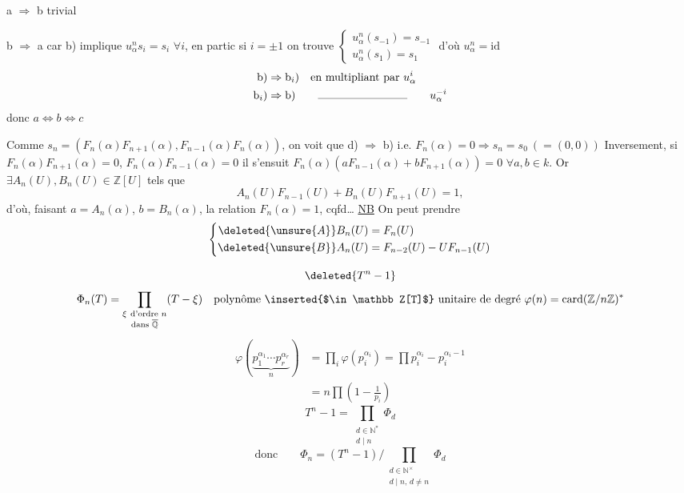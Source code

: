 a $\Rightarrow$ b trivial

b $\Rightarrow$ a car b) implique  $u_\alpha^ns_i=s_i$ $\forall i$, en
partic si $i=\pm1$ on trouve $\begin{cases}u_\alpha^n(s_{-1})=s_{-1}\\u_\alpha^n(s_1)=s_1\end{cases}$
d'où $u_\alpha^n=\mathrm{id}$
\[
\begin{aligned}
\text{b)}&\Rightarrow\text{b}_i\text{)}\quad\text{en multipliant par }u_\alpha^i\\
\text{b}_i\text{)}&\Rightarrow\text{b)}\qquad\rule{2.8cm}{.3pt}\qquad u_\alpha^{-i}
\end{aligned}
\]
donc $a\Longleftrightarrow b\Longleftrightarrow c$

Comme $s_n=(F_n(\alpha)F_{n+1}(\alpha),F_{n-1}(\alpha)F_n(\alpha))$, on voit
que d) $\Rightarrow$ b) i.e. $F_n(\alpha)=0\Rightarrow s_n=s_0\ (=(0,0))$
Inversement, si $F_n(\alpha)F_{n+1}(\alpha)=0$, $F_n(\alpha)F_{n-1}(\alpha)=0$ 
il s'ensuit $F_n(\alpha)(a F_{n-1}(\alpha)+b F_{n+1}(\alpha))=0$ $\forall a,b\in k$.
Or $\exists A_n(U),B_n(U)\in\mathbb Z[U]$ tels que
\[
A_n(U)F_{n-1}(U)+B_n(U)F_{n+1}(U)=1,
\]
d'où, faisant $a=A_n(\alpha)$, $b=B_n(\alpha)$, la relation $F_n(\alpha)=1$,
cqfd\ldots
\uline{NB} On peut prendre
\[
\left\{\begin{aligned}
\deleted{\unsure{A}}B_n(U)&=F_n(U)\\
\deleted{\unsure{B}}A_n(U)&=F_{n-2}(U)-UF_{n-1}(U)
\end{aligned}\right.
\]

\[
\deleted{T^n-1}
\]
\[
\Phi_n(T)=\prod_{\substack{\xi\ \text{d'ordre }n\\ \text{dans }\overline{\mathbb Q}}}(T-\xi)
\quad\text{polynôme \inserted{$\in\mathbb Z[T]$} unitaire de degré }\varphi(n)=\operatorname{card}(\mathbb Z/n\mathbb Z)^*
\]
\[
\begin{aligned}
\varphi(\underbrace{p_1^{\alpha_1}\cdots p_r^{\alpha_r}}_{n})
 &=\prod_i\varphi(p_i^{\alpha_i})=\prod p_i^{\alpha_i}-p_i^{\alpha_i-1}\\
 &=n\prod\left(1-\frac1{p_i}\right)
\end{aligned}
\]
\[
T^n-1=\prod_{\substack{d\in\mathbb N^*\\ d\mid n}}\Phi_d
\]
\[
\text{donc}\qquad
\Phi_n=(T^n-1)\big/\prod_{\substack{d\in\mathbb N^{\times}\\ d\mid n,\,d\ne n}}\Phi_d
\]

